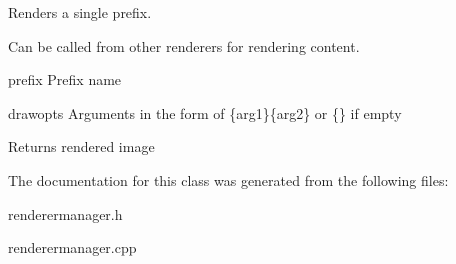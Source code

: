 \-Renders a single prefix. 

\-Can be called from other renderers for rendering content. \begin{DoxyItemize}
\item prefix \-Prefix name \item drawopts \-Arguments in the form of \{arg1\}\{arg2\} or \{\} if empty \begin{DoxyReturn}{\-Returns}
rendered image 
\end{DoxyReturn}
\end{DoxyItemize}


\-The documentation for this class was generated from the following files\-:\begin{DoxyCompactItemize}
\item 
renderermanager.\-h\item 
renderermanager.\-cpp\end{DoxyCompactItemize}
